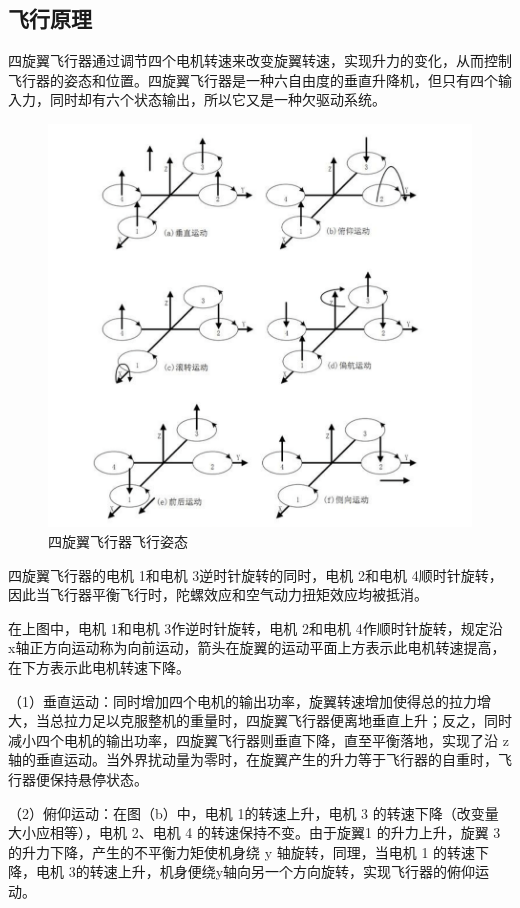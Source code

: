 \documentclass{ctexart}
\begin{document}
\subsection{飞行原理}
四旋翼飞行器通过调节四个电机转速来改变旋翼转速，实现升力的变化，从而控制飞行器的姿态和位置。四旋翼飞行器是一种六自由度的垂直升降机，但只有四个输入力，同时却有六个状态输出，所以它又是一种欠驱动系统。
\begin{figure}[H]
\centering
    \includegraphics[width = \textwidth]{006}
    \caption{四旋翼飞行器飞行姿态}\par
\end{figure}
四旋翼飞行器的电机 1和电机 3逆时针旋转的同时，电机 2和电机 4顺时针旋转，因此当飞行器平衡飞行时，陀螺效应和空气动力扭矩效应均被抵消。\par
在上图中，电机 1和电机 3作逆时针旋转，电机 2和电机 4作顺时针旋转，规定沿 x轴正方向运动称为向前运动，箭头在旋翼的运动平面上方表示此电机转速提高，在下方表示此电机转速下降。\par
（1）垂直运动：同时增加四个电机的输出功率，旋翼转速增加使得总的拉力增大，当总拉力足以克服整机的重量时，四旋翼飞行器便离地垂直上升；反之，同时减小四个电机的输出功率，四旋翼飞行器则垂直下降，直至平衡落地，实现了沿 z轴的垂直运动。当外界扰动量为零时，在旋翼产生的升力等于飞行器的自重时，飞行器便保持悬停状态。\par 
（2）俯仰运动：在图（b）中，电机 1的转速上升，电机 3 的转速下降（改变量大小应相等），电机 2、电机 4 的转速保持不变。由于旋翼1 的升力上升，旋翼 3 的升力下降，产生的不平衡力矩使机身绕 y 轴旋转，同理，当电机 1 的转速下降，电机 3的转速上升，机身便绕y轴向另一个方向旋转，实现飞行器的俯仰运动。\par
\end{document}
